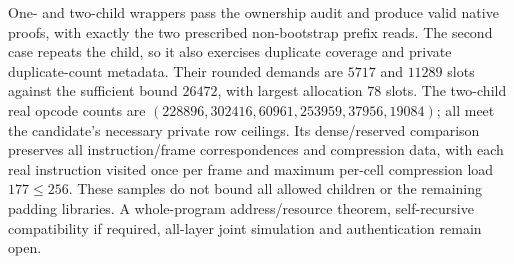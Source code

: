 One- and two-child wrappers pass the ownership audit and produce valid native proofs, with exactly the two prescribed non-bootstrap prefix reads. The second case repeats the child, so it also exercises duplicate coverage and private duplicate-count metadata. Their rounded demands are $5717$ and $11289$ slots against the sufficient bound $26472$, with largest allocation $78$ slots. The two-child real opcode counts are $(228896,302416,60961,253959,37956,19084)$; all meet the candidate's necessary private row ceilings. Its dense/reserved comparison preserves all instruction/frame correspondences and compression data, with each real instruction visited once per frame and maximum per-cell compression load $177\le256$. These samples do not bound all allowed children or the remaining padding libraries. A whole-program address/resource theorem, self-recursive compatibility if required, all-layer joint simulation and authentication remain open.
